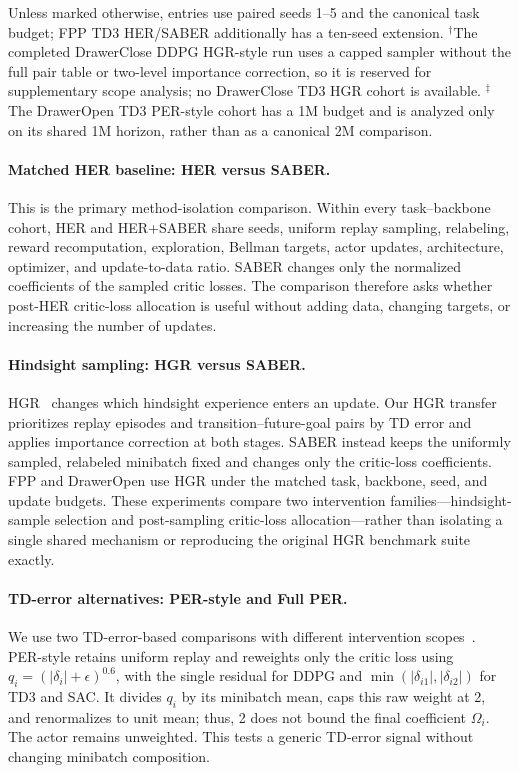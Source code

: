 \documentclass[letterpaper]{article}
\begin{document}
Unless marked otherwise, entries use paired seeds 1--5 and the canonical task budget; FPP TD3 HER/SABER additionally has a ten-seed extension. $^{\dagger}$The completed DrawerClose DDPG HGR-style run uses a capped sampler without the full pair table or two-level importance correction, so it is reserved for supplementary scope analysis; no DrawerClose TD3 HGR cohort is available. $^{\ddagger}$The DrawerOpen TD3 PER-style cohort has a 1M budget and is analyzed only on its shared 1M horizon, rather than as a canonical 2M comparison.

\paragraph{Matched HER baseline: HER versus SABER.}
This is the primary method-isolation comparison. Within every task--backbone cohort, HER and HER+SABER share seeds, uniform replay sampling, relabeling, reward recomputation, exploration, Bellman targets, actor updates, architecture, optimizer, and update-to-data ratio. SABER changes only the normalized coefficients of the sampled critic losses. The comparison therefore asks whether post-HER critic-loss allocation is useful without adding data, changing targets, or increasing the number of updates.

\paragraph{Hindsight sampling: HGR versus SABER.}
HGR~\citep{luu2021hgr} changes which hindsight experience enters an update. Our HGR transfer prioritizes replay episodes and transition--future-goal pairs by TD error and applies importance correction at both stages. SABER instead keeps the uniformly sampled, relabeled minibatch fixed and changes only the critic-loss coefficients. FPP and DrawerOpen use HGR under the matched task, backbone, seed, and update budgets. These experiments compare two intervention families---hindsight-sample selection and post-sampling critic-loss allocation---rather than isolating a single shared mechanism or reproducing the original HGR benchmark suite exactly.

\paragraph{TD-error alternatives: PER-style and Full PER.}
We use two TD-error-based comparisons with different intervention scopes~\citep{schaul2015per}. PER-style retains uniform replay and reweights only the critic loss using \(q_i=(|\delta_i|+\epsilon)^{0.6}\), with the single residual for DDPG and \(\min(|\delta_{i1}|,|\delta_{i2}|)\) for TD3 and SAC. It divides \(q_i\) by its minibatch mean, caps this raw weight at 2, and renormalizes to unit mean; thus, 2 does not bound the final coefficient \(\Omega_i\). The actor remains unweighted. This tests a generic TD-error signal without changing minibatch composition.
\end{document}
